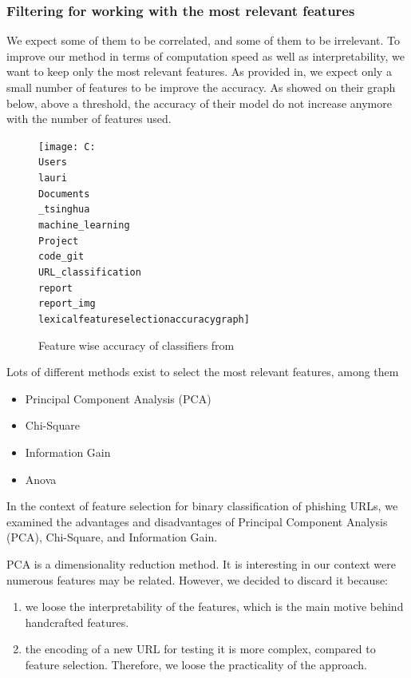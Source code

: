 \documentclass{article}
\begin{document}
    \subsubsection{Filtering for working with the most relevant features}

    We expect some of them to be correlated, and some of them to be irrelevant.
    To improve our method in terms of computation speed as well as interpretability, we want to keep only the most relevant features.
    As provided in\cite{LexicalFeatureSelection}, we expect only a small number of features to be improve the accuracy.
    As showed on their graph below, above a threshold, the accuracy of their model do not increase anymore with the number of features used.

    \begin{figure}[H]
        \centering
        \texttt{[image: C:\\Users\\lauri\\Documents\\\_tsinghua\\machine\_learning\\Project\\code\_git\\URL\_classification\\report\\report\_img\\lexicalfeatureselectionaccuracygraph]}
        \caption{Feature wise accuracy of classifiers from\cite{LexicalFeatureSelection}}
        \label{fig:}
    \end{figure}

    Lots of different methods exist to select the most relevant features, among them
    \begin{itemize}
        \item Principal Component Analysis (PCA)
        \item Chi-Square
        \item Information Gain
        \item Anova %
    \end{itemize}

    In the context of feature selection for binary classification of phishing URLs, we examined the advantages and disadvantages of Principal Component Analysis (PCA), Chi-Square, and Information Gain.

    PCA is a dimensionality reduction method.
    It is interesting in our context were numerous features may be related.
    However, we decided to discard it because:
    \begin{enumerate}
        \item we loose the interpretability of the features, which is the main motive behind handcrafted features.
        \item the encoding of a new URL for testing it is more complex, compared to feature selection.
        Therefore, we loose the practicality of the approach.
    \end{enumerate}
\end{document}

